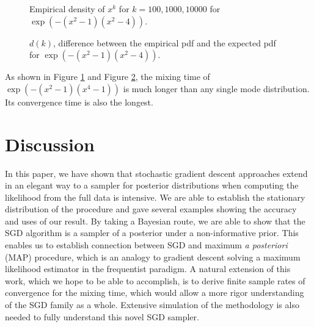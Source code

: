 \documentclass[preprint,12pt,3p]{elsarticle}
\begin{document}
\begin{figure}
\centering
\caption{Empirical density of $x^k$ for $k = 100, 1000, 10000$ for $\exp(- (x^2 - 1)(x^2 - 4))$. }\label{Fig:sim3_3}
\end{figure}

\begin{figure}
\centering
\caption{$d(k)$, difference between the empirical pdf and the expected pdf for $\exp(- (x^2 - 1)(x^2 - 4))$. }\label{Fig:sim3_4}
\end{figure}
As shown in Figure \ref{Fig:sim3_3} and Figure \ref{Fig:sim3_4}, the mixing time of $\exp(-(x^2 - 1)(x^4 - 1))$ is much longer than any single mode distribution. Its convergence time is also the longest.

\newpage
\section{Discussion} %
\label{sec:discussion}


In this paper, we have shown that stochastic gradient descent approaches extend in an elegant way to a sampler for posterior distributions when computing the likelihood from the full data is intensive. We are able to establish the stationary distribution of the procedure and gave several examples showing the accuracy and uses of our result. By taking a Bayesian route, we are able to show that the SGD algorithm is a sampler of a posterior under a non-informative prior. This enables us to establish connection between SGD and maximum \emph{a posteriori} (MAP) procedure, which is an analogy to gradient descent solving a maximum likelihood estimator in the frequentist paradigm. A natural extension of this work, which we hope to be able to accomplish, is to derive finite sample rates of convergence for the mixing time, which would allow a more rigor understanding of the SGD family as a whole. Extensive simulation of the methodology is also needed to fully understand this novel SGD sampler.
\end{document}
